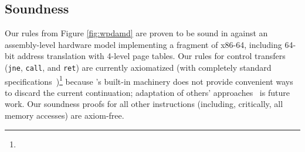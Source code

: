 \subsection{Soundness}
\label{sec:soundness}
Our rules from Figure \ref{fig:wpdamd} are proven to be sound in \iris against an assembly-level hardware model
implementing a fragment of x86-64, including 64-bit address translation with 4-level page tables.
Our rules for control transfers (\lstinline|jne|, \lstinline|call|, and \lstinline|ret|) are currently
axiomatized (with completely standard specifications~\cite{ni2007contexts,Chlipala2013Bedrock})\footnote{
} 
because \iris's built-in machinery does not provide
convenient ways to discard the current continuation; adaptation of others'
approaches~\cite{de2023type} is future work.
Our soundness proofs for all other instructions (including, critically, all memory accesses)
are axiom-free.
